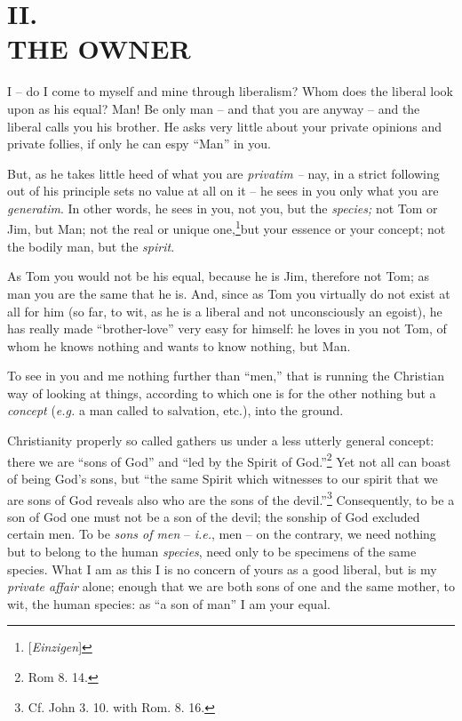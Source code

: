 
\chapter[II. The Owner]{\centering II.\\
THE OWNER}

I -- do I come to myself and mine through liberalism? Whom does the liberal 
look upon as his equal? Man! Be only man -- and that you are anyway -- and the 
liberal calls you his brother. He asks very little about your private opinions 
and private follies, if only he can espy ``Man'' in you.

But, as he takes little heed of what you are \textit{privatim --} nay, in a 
strict following out of his principle sets no value at all on it -- he sees in 
you only what you are \textit{generatim}. In other words, he sees in you, not 
you, but the \textit{species;} not Tom or Jim, but Man; not the real or unique 
one,\footnote{[\textit{Einzigen}] }but your essence or your concept; not the 
bodily man, but the \textit{spirit}.

As Tom you would not be his equal, because he is Jim, therefore not Tom; as 
man you are the same that he is. And, since as Tom you virtually do not exist 
at all for him (so far, to wit, as he is a liberal and not unconsciously an 
egoist), he has really made ``brother-love'' very easy for himself: he loves 
in you not Tom, of whom he knows nothing and wants to know nothing, but Man.

To see in you and me nothing further than ``men,'' that is running the 
Christian way of looking at things, according to which one is for the other 
nothing but a \textit{concept} (\textit{e.g.} a man called to salvation, 
etc.), into the ground.

Christianity properly so called gathers us under a less utterly general 
concept: there we are ``sons of God'' and ``led by the Spirit of 
God.''\footnote{Rom 8. 14.} Yet not all can boast of being God's sons, but 
``the same Spirit which witnesses to our spirit that we are sons of God 
reveals also who are the sons of the devil.''\footnote{Cf. John 3. 10. with 
Rom. 8. 16.} Consequently, to be a son of God one must not be a son of the 
devil; the sonship of God excluded certain men. To be \textit{sons of men} -- 
\textit{i.e.}, men -- on the contrary, we need nothing but to belong to the 
human \textit{species}, need only to be specimens of the same species. What I 
am as this I is no concern of yours as a good liberal, but is my 
\textit{private affair} alone; enough that we are both sons of one and the 
same mother, to wit, the human species: as ``a son of man'' I am your equal.

